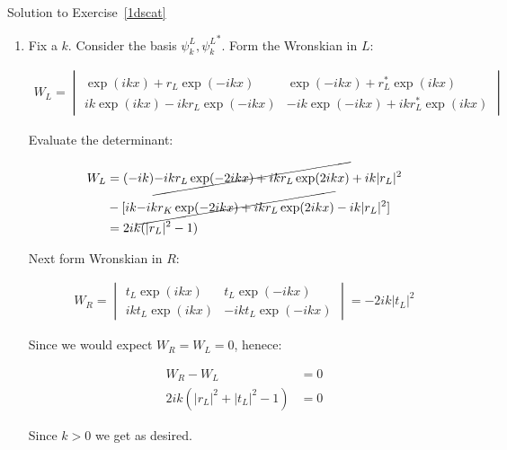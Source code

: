 \begin{mystsolution}{Solution to Exercise~\ref{1dscat}}\begin{enumerate}
\item Fix a $k$. Consider the basis $\psi_k^L, {\psi_k^L}^*$. Form the Wronskian in $L$:

\begin{equation}
\begin{aligned}
W_L=\begin{vmatrix}
\exp(ikx)+r_L\exp(-ikx) &   \exp(-ikx)+r_L^*\exp(ikx) \\
ik\exp(ikx)-ikr_L\exp(-ikx) & -ik\exp(-ikx)+ikr_L^*\exp(ikx)
\end{vmatrix}
\end{aligned}
\end{equation}


Evaluate the determinant:

\begin{equation}
\begin{aligned}
W_L &= (-ik)\cancel{-ikr_L\exp(-2ikx) + ikr_L\exp(2ikx)}+ik|r_L|^2  \\
&-[ik\cancel{-ikr_K\exp(-2ikx)+ikr_L\exp(2ikx)}-ik|r_L|^2]  \\
&= 2ik(|r_L|^2-1)
\end{aligned}
\end{equation}


Next form Wronskian in $R$:

\begin{equation}
\begin{aligned}
W_R = \begin{vmatrix}
t_L\exp(ikx) & t_L\exp(-ikx) \\
ikt_L\exp(ikx) & -ikt_L\exp(-ikx) 
\end{vmatrix} = -2ik|t_L|^2
\end{aligned}
\end{equation}


Since we would expect $W_R=W_L=0$, henece:

\begin{equation}
\begin{aligned}
W_R-W_L&=0 \\
2ik(|r_L|^2+|t_L|^2-1) &=0
\end{aligned}
\end{equation}


Since $k>0$ we get as desired.
\end{enumerate}


\end{mystsolution}

